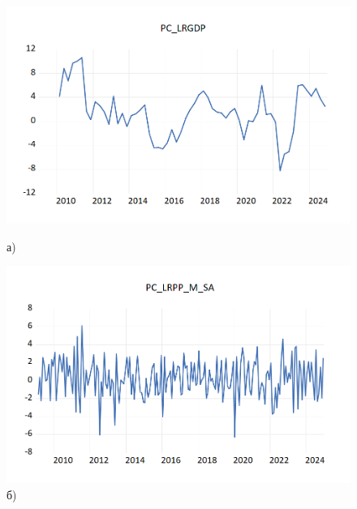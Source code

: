 \documentclass[a4paper, 14pt]{extreport}
\numberwithin{equation}{section}
\numberwithin{equation}{section}
\begin{document}
	\begin{figure}[h!]
		\centering
		\begin{minipage}{0.5\textwidth}
			\centering
			\includegraphics[scale=0.4]{images/image22}
			\caption*{а)}
		\end{minipage}%
		\begin{minipage}{0.5\textwidth}
			\centering
			\includegraphics[scale=0.4]{images/image23}
			\caption*{б)}
		\end{minipage}%
		

\end{figure}
\end{document}
